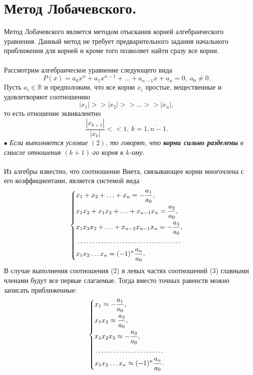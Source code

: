 \documentclass[a4paper, 12pt]{report}
\numberwithin{equation}{section}
\newcommand{\Rm}{\mathbb{R}}
\begin{document}
\section{Метод Лобачевского.}
Метод Лобачевского является методом отыскания корней алгебраического уравнения. Данный метод не требует предварительного задания начального приближения для корней и кроме того позволяет найти сразу все корни.\\\\
Рассмотрим алгебраическое уравнение следующего вида 
\begin{equation}
	P(x) = a_0x^n + a_1x^{n-1} + \ldots + a_{n-1}x + a_n = 0,\ a_0 \ne 0.
\end{equation}
Пусть $a_i\in \Rm$ и предположим, что все корни $x_i$ простые, вещественные и удовлетворяют соотношению 
\begin{equation}
	|x_1| >> |x_2| >> \ldots >> |x_n|,
\end{equation}
то есть отношение эквивалентно $$\dfrac{|x_{k+1}|}{|x_k|}<<1,\ k=\overline{1,n-1}.$$
$\bullet$ \textit{Если выполняется условие $(2)$, то говорят, что \textbf{корни сильно разделены} в смысле отношения $(k+1)$-го корня к $k$-ому.} 
\\\\
Из алгебры известно, что соотношение Виета, связывающее корни многочлена с его коэффициентами, является системой вида 
\begin{equation}
	\begin{dcases}
		x_1 + x_2 + \ldots + x_n = -\dfrac{a_1}{a_0},\\
		x_1x_2 + x_1x_3 + \ldots + x_{n-1}x_n = \dfrac{a_2}{a_0},\\
		x_1x_2x_3 + \ldots + x_{n-2} x_{n-1}x_n = -\dfrac{a_3}{a_0},\\
		\dotfill\\
		x_1x_2\ldots x_n=(-1)^n\dfrac{a_n}{a_0}.
	\end{dcases}
\end{equation}
В случае выполнения соотношения (2) в левых частях соотношений (3) главными членами будут все первые слагаемые. Тогда вместо точных равенств можно записать приближенные: $$\begin{dcases}
x_1 \approx -\dfrac{a_1}{a_0},\\
x_1x_2 \approx \dfrac{a_2}{a_0},\\
x_1x_2x_3 \approx - \dfrac{a_3}{a_0},\\
\dotfill\\
x_1x_2\ldots x_n \approx (-1)^n\dfrac{a_n}{a_0}.
\end{dcases}$$
\end{document}
